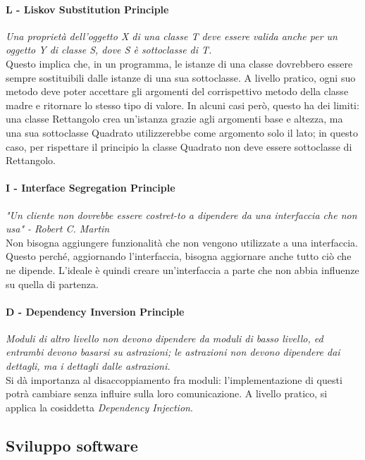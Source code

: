 \documentclass{article}
\begin{document}
        \paragraph{L - Liskov Substitution Principle} \textit{Una proprietà dell'oggetto X di una classe T deve essere valida anche per un oggetto Y di classe S, dove S è sottoclasse di T.}\\
        Questo implica che, in un programma, le istanze di una classe dovrebbero essere sempre sostituibili dalle istanze di una sua sottoclasse. A livello pratico, ogni suo metodo deve poter accettare gli argomenti del corrispettivo metodo della classe madre e ritornare lo stesso tipo di valore. In alcuni casi però, questo ha dei limiti: una classe Rettangolo crea un'istanza grazie agli argomenti base e altezza, ma una sua sottoclasse Quadrato utilizzerebbe come argomento solo il lato; in questo caso, per rispettare il principio la classe Quadrato non deve essere sottoclasse di Rettangolo.
        \paragraph{I - Interface Segregation Principle}
            \textit{"Un cliente non dovrebbe essere costret-to a dipendere da una interfaccia che non usa" - Robert C. Martin}\\
            Non bisogna aggiungere funzionalità che non vengono utilizzate a una interfaccia. Questo perché, aggiornando l'interfaccia, bisogna aggiornare anche tutto ciò che ne dipende. L'ideale è quindi creare un'interfaccia a parte che non abbia influenze su quella di partenza.
        \paragraph{D - Dependency Inversion Principle} 
            \textit{Moduli di altro livello non devono dipendere da moduli di basso livello, ed entrambi devono basarsi su astrazioni; le astrazioni non devono dipendere dai dettagli, ma i dettagli dalle astrazioni.}\\
            Si dà importanza al disaccoppiamento fra moduli: l'implementazione di questi potrà cambiare senza influire sulla loro comunicazione. A livello pratico, si applica la cosiddetta \textit{Dependency Injection}.

    \subsection{Sviluppo software}
\end{document}
